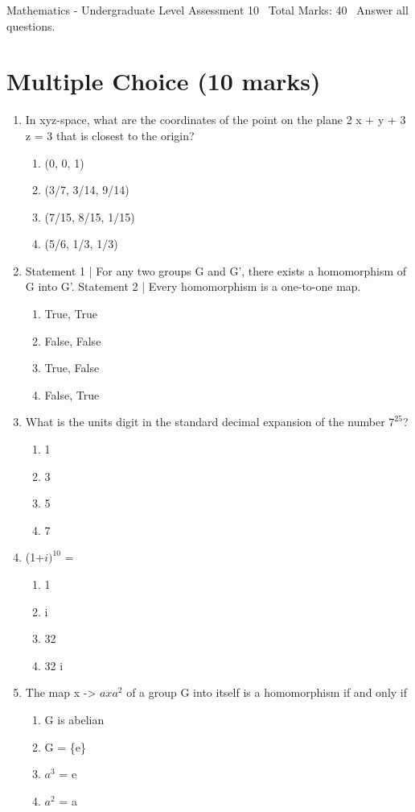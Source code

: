 \documentclass[12pt]{article}
\begin{document}
\begin{center}
Mathematics - Undergraduate Level Assessment 10 \
Total Marks: 40 \
Answer all questions.
\end{center}

\section*{Multiple Choice (10 marks)}
\begin{enumerate}[label=\arabic*.]
\item In xyz-space, what are the coordinates of the point on the plane 2 x + y + 3 z = 3 that is closest to the origin?
\begin{enumerate}[label=(\alph*)]
    \item (0, 0, 1)
    \item (3/7, 3/14, 9/14)
    \item (7/15, 8/15, 1/15)
    \item (5/6, 1/3, 1/3)
\end{enumerate}
\item Statement 1 | For any two groups G and G', there exists a homomorphism of G into G'. Statement 2 | Every homomorphism is a one-to-one map.
\begin{enumerate}[label=(\alph*)]
    \item True, True
    \item False, False
    \item True, False
    \item False, True
\end{enumerate}
\item What is the units digit in the standard decimal expansion of the number $7^25$?
\begin{enumerate}[label=(\alph*)]
    \item 1
    \item 3
    \item 5
    \item 7
\end{enumerate}
\item (1+$i)^10$ =
\begin{enumerate}[label=(\alph*)]
    \item 1
    \item i
    \item 32
    \item 32 i
\end{enumerate}
\item The map x -\textgreater{} $axa^2$ of a group G into itself is a homomorphism if and only if
\begin{enumerate}[label=(\alph*)]
    \item G is abelian
    \item G = \{e\}
    \item $a^3$ = e
    \item $a^2$ = a
\end{enumerate}
\end{enumerate}
\end{document}
